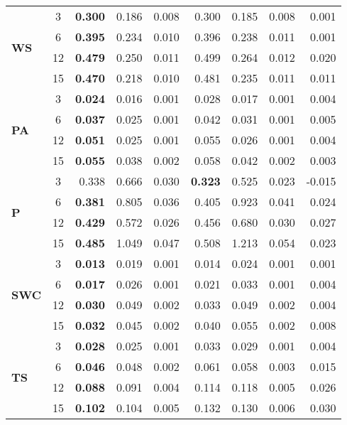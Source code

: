 \begin{table}
\begin{tabular}{p{2.1cm}c|rrr|rrr|r}
\multirow[c]{4}{*}{\parbox{2.1cm}{\textbf{WS}}} & 3 & \bfseries 0.300 & 0.186 & 0.008 & 0.300 & 0.185 & 0.008 & 0.001 \\
 & 6 & \bfseries 0.395 & 0.234 & 0.010 & 0.396 & 0.238 & 0.011 & 0.001 \\
 & 12 & \bfseries 0.479 & 0.250 & 0.011 & 0.499 & 0.264 & 0.012 & 0.020 \\
 & 15 & \bfseries 0.470 & 0.218 & 0.010 & 0.481 & 0.235 & 0.011 & 0.011 \\
\cline{1-9}
\multirow[c]{4}{*}{\parbox{2.1cm}{\textbf{PA}}} & 3 & \bfseries 0.024 & 0.016 & 0.001 & 0.028 & 0.017 & 0.001 & 0.004 \\
 & 6 & \bfseries 0.037 & 0.025 & 0.001 & 0.042 & 0.031 & 0.001 & 0.005 \\
 & 12 & \bfseries 0.051 & 0.025 & 0.001 & 0.055 & 0.026 & 0.001 & 0.004 \\
 & 15 & \bfseries 0.055 & 0.038 & 0.002 & 0.058 & 0.042 & 0.002 & 0.003 \\
\cline{1-9}
\multirow[c]{4}{*}{\parbox{2.1cm}{\textbf{P}}} & 3 & 0.338 & 0.666 & 0.030 & \bfseries 0.323 & 0.525 & 0.023 & -0.015 \\
 & 6 & \bfseries 0.381 & 0.805 & 0.036 & 0.405 & 0.923 & 0.041 & 0.024 \\
 & 12 & \bfseries 0.429 & 0.572 & 0.026 & 0.456 & 0.680 & 0.030 & 0.027 \\
 & 15 & \bfseries 0.485 & 1.049 & 0.047 & 0.508 & 1.213 & 0.054 & 0.023 \\
\cline{1-9}
\multirow[c]{4}{*}{\parbox{2.1cm}{\textbf{SWC}}} & 3 & \bfseries 0.013 & 0.019 & 0.001 & 0.014 & 0.024 & 0.001 & 0.001 \\
 & 6 & \bfseries 0.017 & 0.026 & 0.001 & 0.021 & 0.033 & 0.001 & 0.004 \\
 & 12 & \bfseries 0.030 & 0.049 & 0.002 & 0.033 & 0.049 & 0.002 & 0.004 \\
 & 15 & \bfseries 0.032 & 0.045 & 0.002 & 0.040 & 0.055 & 0.002 & 0.008 \\
\cline{1-9}
\multirow[c]{4}{*}{\parbox{2.1cm}{\textbf{TS}}} & 3 & \bfseries 0.028 & 0.025 & 0.001 & 0.033 & 0.029 & 0.001 & 0.004 \\
 & 6 & \bfseries 0.046 & 0.048 & 0.002 & 0.061 & 0.058 & 0.003 & 0.015 \\
 & 12 & \bfseries 0.088 & 0.091 & 0.004 & 0.114 & 0.118 & 0.005 & 0.026 \\
 & 15 & \bfseries 0.102 & 0.104 & 0.005 & 0.132 & 0.130 & 0.006 & 0.030 \\
\cline{1-9}
\bottomrule
\end{tabular}
\end{table}
